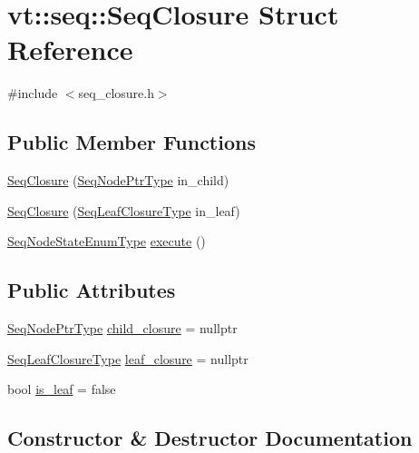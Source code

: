 \hypertarget{structvt_1_1seq_1_1_seq_closure}{}\section{vt\+:\+:seq\+:\+:Seq\+Closure Struct Reference}
\label{structvt_1_1seq_1_1_seq_closure}


{\ttfamily \#include $<$seq\+\_\+closure.\+h$>$}

\subsection*{Public Member Functions}
\begin{DoxyCompactItemize}
\item 
\hyperlink{structvt_1_1seq_1_1_seq_closure_a5e5a20af997bc451c2c1037e660cd2ae}{Seq\+Closure} (\hyperlink{namespacevt_1_1seq_ae6a4874b585be0612aaca32ca6d2d191}{Seq\+Node\+Ptr\+Type} in\+\_\+child)
\item 
\hyperlink{structvt_1_1seq_1_1_seq_closure_a9d4b343e005128e44324846f46336a92}{Seq\+Closure} (\hyperlink{namespacevt_1_1seq_a13c76fb1c62795dfd2d359b2dde35e8a}{Seq\+Leaf\+Closure\+Type} in\+\_\+leaf)
\item 
\hyperlink{namespacevt_1_1seq_ad7b0496818667d816e00f717491d3b92}{Seq\+Node\+State\+Enum\+Type} \hyperlink{structvt_1_1seq_1_1_seq_closure_a50a3833f66d0527231bf50ba3ea4d149}{execute} ()
\end{DoxyCompactItemize}
\subsection*{Public Attributes}
\begin{DoxyCompactItemize}
\item 
\hyperlink{namespacevt_1_1seq_ae6a4874b585be0612aaca32ca6d2d191}{Seq\+Node\+Ptr\+Type} \hyperlink{structvt_1_1seq_1_1_seq_closure_afb90e1523500d229a84622ea78174e19}{child\+\_\+closure} = nullptr
\item 
\hyperlink{namespacevt_1_1seq_a13c76fb1c62795dfd2d359b2dde35e8a}{Seq\+Leaf\+Closure\+Type} \hyperlink{structvt_1_1seq_1_1_seq_closure_a8489de87b5b4d74cbcfb7e8624068907}{leaf\+\_\+closure} = nullptr
\item 
bool \hyperlink{structvt_1_1seq_1_1_seq_closure_aa2ac69110e7697d2250b218b227ce60a}{is\+\_\+leaf} = false
\end{DoxyCompactItemize}


\subsection{Constructor \& Destructor Documentation}
\mbox{\label{structvt_1_1seq_1_1_seq_closure_a5e5a20af997bc451c2c1037e660cd2ae}} 
